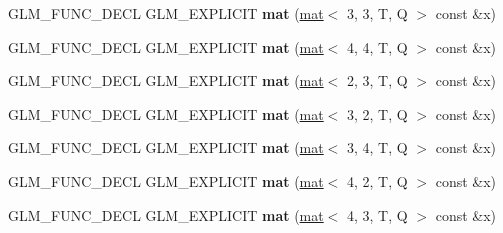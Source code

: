 \begin{DoxyCompactItemize}
G\+L\+M\+\_\+\+F\+U\+N\+C\+\_\+\+D\+E\+CL G\+L\+M\+\_\+\+E\+X\+P\+L\+I\+C\+IT {\bfseries mat} (\hyperlink{structglm_1_1mat}{mat}$<$ 3, 3, T, Q $>$ const \&x)
\item 
\mbox{\label{structglm_1_1mat_3_012_00_014_00_01T_00_01Q_01_4_aaf1ee776c40479ad1a688fcb12626114}} 
G\+L\+M\+\_\+\+F\+U\+N\+C\+\_\+\+D\+E\+CL G\+L\+M\+\_\+\+E\+X\+P\+L\+I\+C\+IT {\bfseries mat} (\hyperlink{structglm_1_1mat}{mat}$<$ 4, 4, T, Q $>$ const \&x)
\item 
\mbox{\label{structglm_1_1mat_3_012_00_014_00_01T_00_01Q_01_4_a6f5d265d1089df2a8c6ae0ae93e5476b}} 
G\+L\+M\+\_\+\+F\+U\+N\+C\+\_\+\+D\+E\+CL G\+L\+M\+\_\+\+E\+X\+P\+L\+I\+C\+IT {\bfseries mat} (\hyperlink{structglm_1_1mat}{mat}$<$ 2, 3, T, Q $>$ const \&x)
\item 
\mbox{\label{structglm_1_1mat_3_012_00_014_00_01T_00_01Q_01_4_a5d111aa638038af91114d7703418450f}} 
G\+L\+M\+\_\+\+F\+U\+N\+C\+\_\+\+D\+E\+CL G\+L\+M\+\_\+\+E\+X\+P\+L\+I\+C\+IT {\bfseries mat} (\hyperlink{structglm_1_1mat}{mat}$<$ 3, 2, T, Q $>$ const \&x)
\item 
\mbox{\label{structglm_1_1mat_3_012_00_014_00_01T_00_01Q_01_4_a42dfde722cd81608b67cf8373f8b9f53}} 
G\+L\+M\+\_\+\+F\+U\+N\+C\+\_\+\+D\+E\+CL G\+L\+M\+\_\+\+E\+X\+P\+L\+I\+C\+IT {\bfseries mat} (\hyperlink{structglm_1_1mat}{mat}$<$ 3, 4, T, Q $>$ const \&x)
\item 
\mbox{\label{structglm_1_1mat_3_012_00_014_00_01T_00_01Q_01_4_ac6f99b906a30d145d6ae5424bcbeb18d}} 
G\+L\+M\+\_\+\+F\+U\+N\+C\+\_\+\+D\+E\+CL G\+L\+M\+\_\+\+E\+X\+P\+L\+I\+C\+IT {\bfseries mat} (\hyperlink{structglm_1_1mat}{mat}$<$ 4, 2, T, Q $>$ const \&x)
\item 
\mbox{\label{structglm_1_1mat_3_012_00_014_00_01T_00_01Q_01_4_a92ad2ed26743d4612824b4dbf1ede0a3}} 
G\+L\+M\+\_\+\+F\+U\+N\+C\+\_\+\+D\+E\+CL G\+L\+M\+\_\+\+E\+X\+P\+L\+I\+C\+IT {\bfseries mat} (\hyperlink{structglm_1_1mat}{mat}$<$ 4, 3, T, Q $>$ const \&x)
\item 

\end{DoxyCompactItemize}
